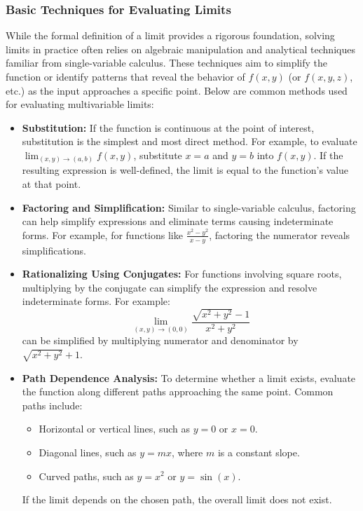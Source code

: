 \subsubsection*{Basic Techniques for Evaluating Limits}

\noindent While the formal definition of a limit provides a rigorous foundation, solving limits in practice often relies on algebraic manipulation and analytical techniques familiar from single-variable calculus. These techniques aim to simplify the function or identify patterns that reveal the behavior of \( f(x, y) \) (or \( f(x, y, z) \), etc.) as the input approaches a specific point. Below are common methods used for evaluating multivariable limits:

\begin{itemize}
    \item \textbf{Substitution:} If the function is continuous at the point of interest, substitution is the simplest and most direct method. For example, to evaluate \( \lim_{(x, y) \to (a, b)} f(x, y) \), substitute \( x = a \) and \( y = b \) into \( f(x, y) \). If the resulting expression is well-defined, the limit is equal to the function's value at that point.

    \item \textbf{Factoring and Simplification:} Similar to single-variable calculus, factoring can help simplify expressions and eliminate terms causing indeterminate forms. For example, for functions like \( \frac{x^2 - y^2}{x - y} \), factoring the numerator reveals simplifications.

    \item \textbf{Rationalizing Using Conjugates:} For functions involving square roots, multiplying by the conjugate can simplify the expression and resolve indeterminate forms. For example:
    \[
    \lim_{(x, y) \to (0, 0)} \frac{\sqrt{x^2 + y^2} - 1}{x^2 + y^2}
    \]
    can be simplified by multiplying numerator and denominator by \( \sqrt{x^2 + y^2} + 1 \).

    \item \textbf{Path Dependence Analysis:} To determine whether a limit exists, evaluate the function along different paths approaching the same point. Common paths include:
    \begin{itemize}
        \item Horizontal or vertical lines, such as \( y = 0 \) or \( x = 0 \).
        \item Diagonal lines, such as \( y = mx \), where \( m \) is a constant slope.
        \item Curved paths, such as \( y = x^2 \) or \( y = \sin(x) \).
    \end{itemize}
    If the limit depends on the chosen path, the overall limit does not exist.


\end{itemize}
